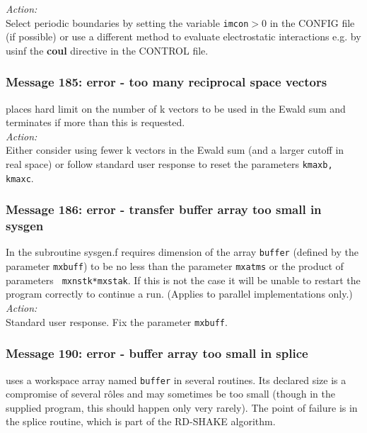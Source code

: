 \noindent
{\em Action:} \\ 
Select periodic boundaries by setting the variable {\tt imcon}$>$0 in
the CONFIG file (if possible) or use a different method to evaluate electrostatic interactions
e.g. by usinf the {\bf coul} directive in the CONTROL file.

\subsubsection*{Message 185: error - too many reciprocal space vectors}

\D{} places hard limit on the number of k vectors to be used in the
Ewald sum  and terminates if more than this is requested. \\

\noindent
{\em Action:} \\ Either consider using fewer k vectors in the Ewald
sum (and a larger cutoff in real space) or follow standard user
response to reset the parameters {\tt kmaxb, kmaxc}.

\subsubsection*{Message 186: error - transfer buffer array too small in sysgen}

In the subroutine {\sc sysgen.f} \D{} requires dimension of the array
{\tt buffer} (defined by the parameter {\tt mxbuff}) to be no less
than the parameter {\tt mxatms} or the product of parameters {\tt
mxnstk*mxstak}. If this is not the case it will be unable to restart
the program correctly to continue a run. (Applies to parallel
implementations only.)\\

\noindent
{\em Action:} \\ Standard user response. Fix the parameter {\tt mxbuff}.

\subsubsection*{Message 190: error - buffer array too small in splice}

\D{} uses a workspace array named {\tt buffer} in several
routines. Its declared size is a compromise of several r\^{o}les and
may sometimes be too small (though in the supplied program, this
should happen only very rarely). The point of failure is in the
{\sc splice} routine, which is part of the RD-SHAKE
algorithm. \\

